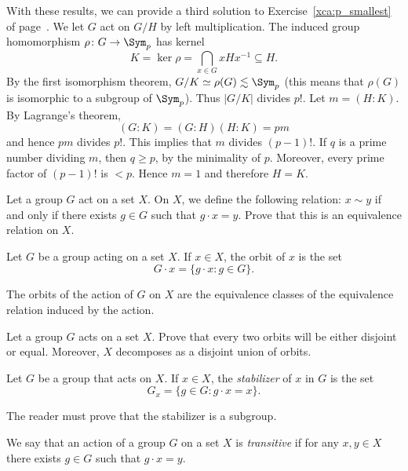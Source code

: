 \begin{optional}
With these results, we can provide a third 
solution to Exercise~\ref{xca:p_smallest} of 
page~\pageref{xca:p_smallest}.
We let  $G$ act on $G/H$ by left multiplication. 
The induced group homomorphism  $\rho\colon G\to\Sym_p$ has 
kernel 
\[
K=\ker\rho=\bigcap_{x\in G}xHx^{-1}\subseteq H.
\]
By the first isomorphism theorem, 
$G/K\simeq\rho(G)\lesssim\Sym_p$ (this means that 
$\rho(G)$ is isomorphic to a subgroup of $\Sym_p$). 
Thus $|G/K|$ divides $p!$.
Let $m=(H:K)$. By Lagrange's theorem,
\[
(G:K)=(G:H)(H:K)=pm
\]
and hence $pm$ divides $p!$. This implies that $m$ divides $(p-1)!$. If $q$ is a prime number dividing 
 $m$, then $q\geq p$, by the minimality of $p$. Moreover, 
 every prime factor of $(p-1)!$ is 
 $<p$. Hence $m=1$ and therefore $H=K$.
\end{optional}
 
\begin{exercise}
    Let a group $G$ act on a set $X$. 
    On $X$, we define the following relation: $x\sim y$ if and only if
    there exists $g\in G$ such that $g\cdot x=y$. Prove 
    that this is an equivalence relation on $X$. 
\end{exercise}

\begin{definition}
Let $G$ be a group acting on a set $X$. If $x\in X$, the
orbit of $x$ is the set
\[
G\cdot x=\{g\cdot x:g\in G\}.
\]
\end{definition}

The orbits of the action of $G$ on $X$ are 
the equivalence classes of the equivalence 
relation induced by the action. 

\begin{exercise}
    Let a group $G$ acts on a set $X$. Prove that 
    every two orbits will be either disjoint or equal. Moreover, 
    $X$ decomposes as a disjoint union of orbits. 
\end{exercise}

\begin{definition}
        Let $G$ be a group that acts on $X$. If $x\in X$, the \emph{stabilizer} of $x$ in $G$
        is the set   
        \[
        G_x=\{g\in G:g\cdot x=x\}.
        \]
\end{definition}

The reader must prove that the stabilizer is a subgroup. 

\begin{definition}
We say that an action of a group $G$ on a set $X$
is \emph{transitive} if for any $x,y\in X$ there exists $g\in G$ such that $g\cdot x=y$.
\end{definition}

